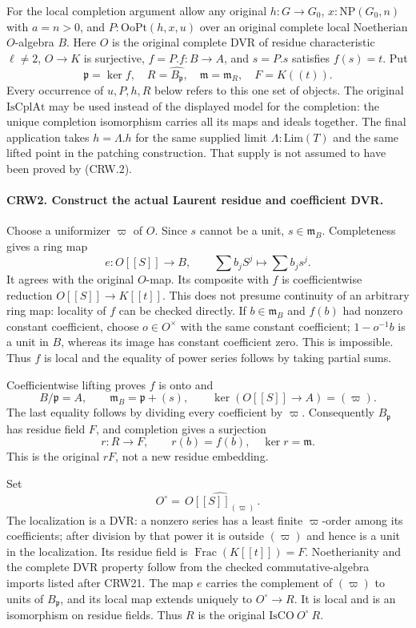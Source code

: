 For the local completion argument allow any original
$h:G\to G_0$, $x:\mathrm{NP}(G_0,n)$ with $a=n>0$, and
$P:\mathrm{OoPt}(h,x,u)$ over an original complete local
Noetherian $O$-algebra $B$.  Here $O$ is the original complete DVR
of residue characteristic $\ell\ne2$, $O\to K$ is surjective,
$f=P.f:B\to A$, and $s=P.s$ satisfies $f(s)=t$.
Put
\[
 \mathfrak p=\ker f,\quad R=\widehat{B_{\mathfrak p}},
 \quad \mathfrak m=\mathfrak m_R,\quad F=K((t)).    \tag{CRW.4}
\]
Every occurrence of $u,P,h,R$ below refers to this one set of
objects.  The original $\mathrm{IsCplAt}$ may be used instead of
the displayed model for the completion: the unique completion
isomorphism carries all its maps and ideals together.
The final application takes $h=\Lambda.h$ for the same supplied
limit $\Lambda:\mathrm{Lim}(T)$ and the same lifted point in the
patching construction.  That supply is not assumed to have been
proved by (CRW.2).

\paragraph{CRW2. Construct the actual Laurent residue and coefficient DVR.}
\label{claim:CRW2}
Choose a uniformizer $\varpi$ of $O$.  Since $s$ cannot be a unit,
$s\in\mathfrak m_B$.  Completeness gives a ring map
\[
 e:O[[S]]\longrightarrow B,\qquad
 \sum b_jS^j\longmapsto\sum b_js^j.
\]
It agrees with the original $O$-map.  Its composite with $f$ is
coefficientwise reduction $O[[S]]\to K[[t]]$.  This does not
presume continuity of an arbitrary ring map: locality of $f$
can be checked directly.
If $b\in\mathfrak m_B$ and $f(b)$ had nonzero constant coefficient,
choose $o\in O^\times$ with the same constant coefficient;
$1-o^{-1}b$ is a unit in $B$, whereas its image has constant
coefficient zero.  This is impossible.  Thus $f$ is local and
the equality of power series follows by taking partial sums.

Coefficientwise lifting proves $f$ is onto and
\[
 B/\mathfrak p=A,\qquad
 \mathfrak m_B=\mathfrak p+(s),\qquad
 \ker(O[[S]]\to A)=(\varpi).                        \tag{CRW.5}
\]
The last equality follows by dividing every coefficient by
$\varpi$.  Consequently $B_{\mathfrak p}$ has residue field $F$,
and completion gives a surjection
\[
 r:R\longrightarrow F,\qquad r(b)=f(b),\quad
 \ker r=\mathfrak m.                               \tag{CRW.6}
\]
This is the original $rF$, not a new residue embedding.

Set
\[
 O^\circ=\widehat{\,O[[S]]_{(\varpi)}\,}.
                                                               \tag{CRW.7}
\]
The localization is a DVR: a nonzero series has a least finite
$\varpi$-order among its coefficients; after division by that
power it is outside $(\varpi)$ and hence is a unit in the
localization.  Its residue field is
$\operatorname{Frac}(K[[t]])=F$.  Noetherianity and the complete
DVR property follow from the checked commutative-algebra imports
listed after CRW21.  The map $e$ carries the complement of
$(\varpi)$ to units of $B_{\mathfrak p}$, and its local map
extends uniquely to
$O^\circ\to R$.  It is local and is an isomorphism on residue
fields.  Thus $R$ is the original $\mathrm{IsCO}\ O^\circ\ R$.

